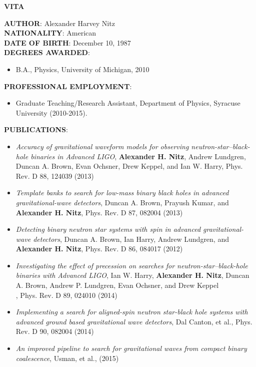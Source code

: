 \thispagestyle{empty}
\begin{center}
{\large {\bf VITA}}
\end{center}
\vspace{1cm}
{\bf AUTHOR}: Alexander Harvey Nitz \\
{\bf NATIONALITY}: American \\
{\bf DATE OF BIRTH}: December 10, 1987 \\
{\bf DEGREES AWARDED}:
\begin{itemize}
\item B.A., Physics, University of Michigan, 2010
\end{itemize}
{\bf PROFESSIONAL EMPLOYMENT}:
\begin{itemize}
\item[] Graduate Teaching/Research Assistant, Department of Physics, Syracuse University (2010-2015).
\end{itemize}
{\bf PUBLICATIONS}:
\begin{itemize}
\item \textit{Accuracy of gravitational waveform models for observing neutron-star–black-hole binaries in Advanced LIGO}, \textbf{Alexander H. Nitz}, Andrew Lundgren, Duncan A. Brown, Evan Ochsner, Drew Keppel, and Ian W. Harry, Phys. Rev. D 88, 124039 (2013)
\item \textit{Template banks to search for low-mass binary black holes in advanced gravitational-wave detectors}, Duncan A. Brown, Prayush Kumar, and \textbf{Alexander H. Nitz}, Phys. Rev. D 87, 082004 (2013)
\item \textit{Detecting binary neutron star systems with spin in advanced gravitational-wave detectors}, Duncan A. Brown, Ian Harry, Andrew Lundgren, and \textbf{Alexander H. Nitz}, Phys. Rev. D 86, 084017 (2012)
\item \textit{Investigating the effect of precession on searches for neutron-star–black-hole binaries with Advanced LIGO}, Ian W. Harry, \textbf{Alexander H. Nitz}, Duncan A. Brown, Andrew P. Lundgren, Evan Ochsner, and Drew Keppel\\, Phys. Rev. D 89, 024010 (2014)
\item \textit{Implementing a search for aligned-spin neutron star-black hole systems with advanced ground based gravitational wave detectors}, Dal Canton, et al., Phys. Rev. D 90, 082004 (2014)
\item \textit{An improved pipeline to search for gravitational waves from compact binary coalescence}, Usman, et al., (2015)

\end{itemize}
